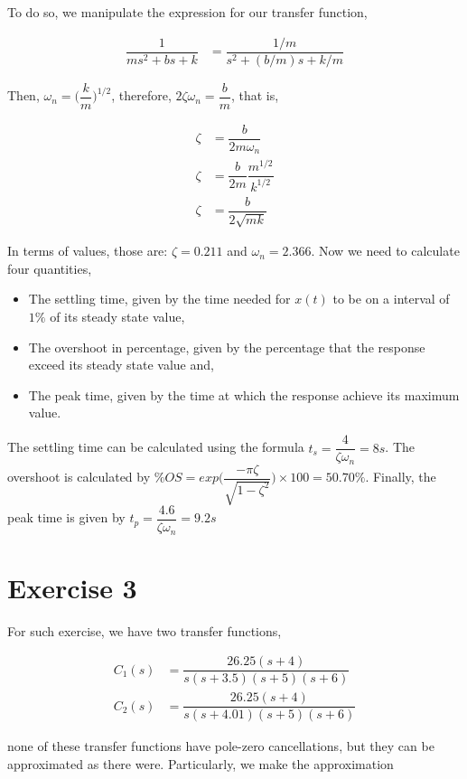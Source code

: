 \documentclass[12pt]{article}
\begin{document}
		To do so, we manipulate the expression for our transfer function,
		
		\begin{align*}
			\dfrac{1}{ms^{2} + bs + k} &= \dfrac{1/m}{s^{2} + (b/m)s + k/m}
		\end{align*}
		
		Then, $\omega_{n} = \biggr(\dfrac{k}{m}\biggr)^{1/2}$, therefore, $2\zeta\omega_{n} = \dfrac{b}{m}$, that is,
		
		\begin{align*}
			\zeta &= \dfrac{b}{2m\omega_{n}}\\
			\zeta &= \dfrac{b}{2m}\dfrac{m^{1/2}}{k^{1/2}}\\
			\zeta &= \dfrac{b}{2\sqrt{mk}}
		\end{align*}
		
		In terms of values, those are: $\zeta = 0.211$ and $\omega_{n} = 2.366$. Now we need to calculate four quantities,
		
		\begin{itemize}
			\item The settling time, given by the time needed for $x(t)$ to be on a interval of $1\%$ of its steady state value,
			\item The overshoot in percentage, given by the percentage that the response exceed its steady state value and,
			\item The peak time, given by the time at which the response achieve its maximum value.
		\end{itemize}
	
		The settling time can be calculated using the formula $t_{s} = \dfrac{4}{\zeta \omega_{n}} = 8s$. The overshoot is calculated by $\%OS = exp\biggr(\dfrac{-\pi\zeta}{\sqrt{1-\zeta^{2}}}\biggr)\times 100 = 50.70\%$. Finally, the peak time is given by $t_{p} = \dfrac{4.6}{\zeta \omega_{n}} = 9.2s$
	\section{Exercise 3}
		For such exercise, we have two transfer functions,
		
		\begin{align}
			C_{1}(s) &= \dfrac{26.25(s+4)}{s(s+3.5)(s+5)(s+6)}\\
			C_{2}(s) &= \dfrac{26.25(s+4)}{s(s+4.01)(s+5)(s+6)}
		\end{align}
		
		none of these transfer functions have pole-zero cancellations, but they can be approximated as there were. Particularly, we make the approximation
		
\end{document}
